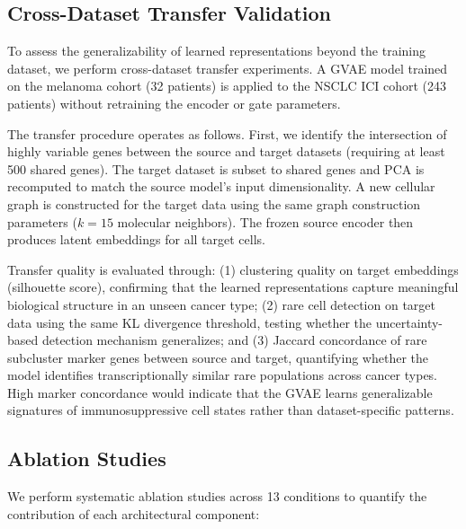 \documentclass{article}
\begin{document}
\subsection{Cross-Dataset Transfer Validation}
\label{sec:transfer}

To assess the generalizability of learned representations beyond the training dataset, we perform cross-dataset transfer experiments. A GVAE model trained on the melanoma cohort (32 patients) is applied to the NSCLC ICI cohort (243 patients) without retraining the encoder or gate parameters.

The transfer procedure operates as follows. First, we identify the intersection of highly variable genes between the source and target datasets (requiring at least 500 shared genes). The target dataset is subset to shared genes and PCA is recomputed to match the source model's input dimensionality. A new cellular graph is constructed for the target data using the same graph construction parameters ($k = 15$ molecular neighbors). The frozen source encoder then produces latent embeddings for all target cells.

Transfer quality is evaluated through: (1) clustering quality on target embeddings (silhouette score), confirming that the learned representations capture meaningful biological structure in an unseen cancer type; (2) rare cell detection on target data using the same KL divergence threshold, testing whether the uncertainty-based detection mechanism generalizes; and (3) Jaccard concordance of rare subcluster marker genes between source and target, quantifying whether the model identifies transcriptionally similar rare populations across cancer types. High marker concordance would indicate that the GVAE learns generalizable signatures of immunosuppressive cell states rather than dataset-specific patterns.

\subsection{Ablation Studies}
\label{sec:ablations}

We perform systematic ablation studies across 13 conditions to quantify the contribution of each architectural component:
\end{document}
